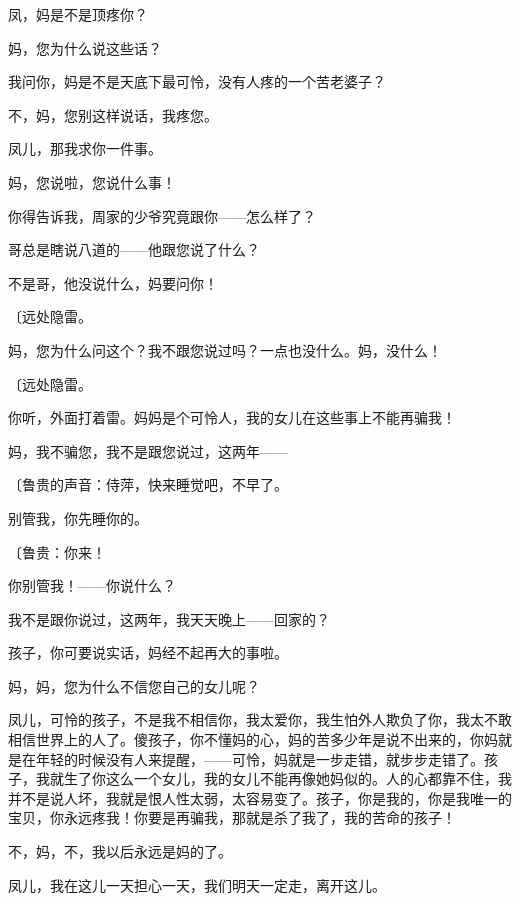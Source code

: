 凤，妈是不是顶疼你？

妈，您为什么说这些话？

我问你，妈是不是天底下最可怜，没有人疼的一个苦老婆子？

不，妈，您别这样说话，我疼您。

凤儿，那我求你一件事。

妈，您说啦，您说什么事！

你得告诉我，周家的少爷究竟跟你——怎么样了？

哥总是瞎说八道的——他跟您说了什么？

不是哥，他没说什么，妈要问你！

{\fangsong〔远处隐雷。}

妈，您为什么问这个？我不跟您说过吗？一点也没什么。妈，没什么！

{\fangsong〔远处隐雷。}

你听，外面打着雷。妈妈是个可怜人，我的女儿在这些事上不能再骗我！

妈，我不骗您，我不是跟您说过，这两年——

{\fangsong〔鲁贵的声音：侍萍，快来睡觉吧，不早了。}

别管我，你先睡你的。

{\fangsong〔鲁贵：你来！}

你别管我！——你说什么？

我不是跟你说过，这两年，我天天晚上——回家的？

孩子，你可要说实话，妈经不起再大的事啦。

妈，妈，您为什么不信您自己的女儿呢？

凤儿，可怜的孩子，不是我不相信你，我太爱你，我生怕外人欺负了你，我太不敢相信世界上的人了。傻孩子，你不懂妈的心，妈的苦多少年是说不出来的，你妈就是在年轻的时候没有人来提醒，——可怜，妈就是一步走错，就步步走错了。孩子，我就生了你这么一个女儿，我的女儿不能再像她妈似的。人的心都靠不住，我并不是说人坏，我就是恨人性太弱，太容易变了。孩子，你是我的，你是我唯一的宝贝，你永远疼我！你要是再骗我，那就是杀了我了，我的苦命的孩子！

不，妈，不，我以后永远是妈的了。

凤儿，我在这儿一天担心一天，我们明天一定走，离开这儿。

